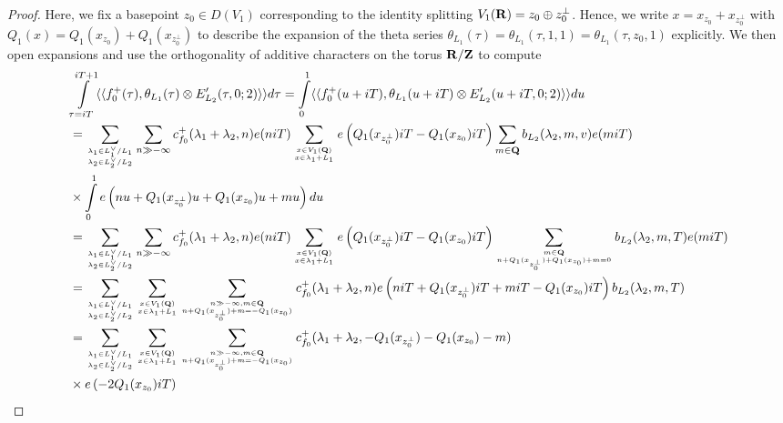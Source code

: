 \documentclass{amsart}
\theoremstyle{definition}
\begin{document}
\begin{proof}
Here, we fix a basepoint $z_0 \in D(V_1)$ corresponding to the identity splitting $V_1({\bf{R}}) = z_0 \oplus z_0^{\perp}$.
Hence, we write $x = x_{z_0} + x_{z_0^{\perp}}$ with $Q_1(x) = Q_1(x_{z_0}) + Q_1(x_{z_0^{\perp}})$
to describe the expansion of the theta series $\theta_{L_1}(\tau) = \theta_{L_1}(\tau, 1, 1) = \theta_{L_1}(\tau, z_0, 1)$ explicitly. 
We then open expansions and use the orthogonality of additive characters on the torus ${\bf{R}}/{\bf{Z}}$ to compute 
\begin{equation}\begin{aligned}\label{CTcalculation}
&\int\limits_{\tau = i T}^{iT + 1} \langle \langle f_0^+(\tau), \theta_{L_1}(\tau) \otimes E_{L_2}'(\tau, 0; 2) \rangle \rangle d \tau
= \int\limits_0^1 \langle \langle f_0^+(u + iT), \theta_{L_1}(u + iT) \otimes E_{L_2}'(u + iT, 0; 2)  \rangle \rangle du \\
&= \sum\limits_{ \lambda_1 \in L_1^{\vee} / L_1 \atop \lambda_2 \in L_2^{\vee}/L_2  }
\sum\limits_{n \gg - \infty} c_{f_0}^+(\lambda_1 + \lambda_2, n) e(niT)
\sum\limits_{x \in V_1({\bf{Q}}) \atop x \in \lambda_1 + L_1} e \left( Q_1(x_{z_0^{\perp}})iT - Q_1(x_{z_0})iT \right)
\sum\limits_{m \in {\bf{Q}}} b_{L_2}(\lambda_2, m, v) e(miT) \\
&\times \int\limits_0^1 e\left( nu + Q_1(x_{z_0^{\perp}})u + Q_1(x_{z_0})u + mu \right) du \\
&= \sum\limits_{ \lambda_1 \in L_1^{\vee} / L_1 \atop \lambda_2 \in L_2^{\vee}/L_2  }
\sum\limits_{n \gg - \infty} c_{f_0}^+(\lambda_1 + \lambda_2, n) e(niT)
\sum\limits_{x \in V_1({\bf{Q}}) \atop x \in \lambda_1 + L_1} e \left( Q_1(x_{z_0^{\perp}})iT - Q_1(x_{z_0})iT \right)
\sum\limits_{m \in {\bf{Q}} \atop n + Q_1(x_{z_0^{\perp}}) + Q_1(x_{z_0}) + m=0 } b_{L_2}(\lambda_2, m, T) e(miT)\\
&=  \sum\limits_{ \lambda_1 \in L_1^{\vee} / L_1 \atop \lambda_2 \in L_2^{\vee}/L_2  } \sum\limits_{x \in V_1({\bf{Q}}) \atop x \in \lambda_1 + L_1} 
\sum\limits_{n \gg - \infty, m \in {\bf{Q}} \atop n + Q_1(x_{z_0^{\perp}}) + m= - Q_1(x_{z_0}) } 
c_{f_0}^+(\lambda_1 + \lambda_2, n) e \left( n iT + Q_1(x_{z_0^{\perp}})iT + miT - Q_1(x_{z_0})iT \right) b_{L_2}(\lambda_2, m, T)  \\
&= \sum\limits_{ \lambda_1 \in L_1^{\vee} / L_1 \atop \lambda_2 \in L_2^{\vee}/L_2  } \sum\limits_{x \in V_1({\bf{Q}}) \atop x \in \lambda_1 + L_1} 
\sum\limits_{n \gg - \infty, m \in {\bf{Q}} \atop n + Q_1(x_{z_0^{\perp}}) + m= - Q_1(x_{z_0}) } 
c_{f_0}^+(\lambda_1 + \lambda_2, -Q_1(x_{z_0^{\perp}}) - Q_1(x_{z_0}) - m) \\ &\times e \left( -2Q_1(x_{z_0}) iT \right)

\end{aligned}
\end{equation}
\end{proof}
\end{document}
